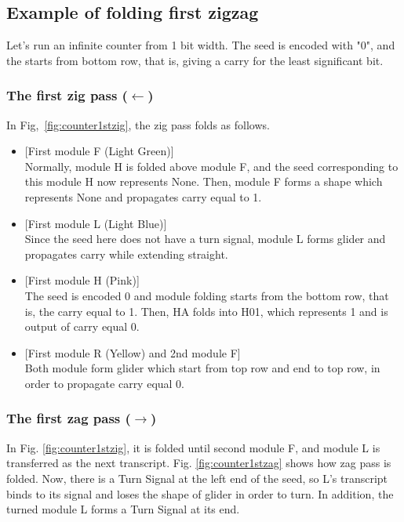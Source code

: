\documentclass[runningheads]{llncs}
\begin{document}
\subsection{Example of folding first zigzag}
Let's run an infinite counter from 1 bit width.
The seed is encoded with "0", and the starts from bottom row, that is, giving a carry for the least significant bit.

\subsubsection{The first zig pass ($\leftarrow$)}
In Fig,~\ref{fig:counter1stzig}, the zig pass folds as follows.
\begin{itemize}
\item{[First module F (Light Green)]} \\Normally, module H is folded above module F, and the seed corresponding to this module H now represents None.
Then, module F forms a shape which represents None and propagates carry equal to 1.
\item{[First module L (Light Blue)]} \\Since the seed here does not have a turn signal, module L forms glider and propagates carry while extending straight.

\item{[First module H (Pink)]} \\The seed is encoded 0 and module folding starts from the bottom row, that is, the carry equal to 1.
Then, HA folds into H01, which represents 1 and is output of carry equal 0.

\item{[First module R (Yellow) and 2nd module F]} \\Both module form glider which start from top row and end to top row, in order to propagate carry equal 0.

\end{itemize}

\subsubsection{The first zag pass ($\rightarrow$)}
In Fig. \ref{fig:counter1stzig}, it is folded until second module F, and module L is transferred as the next transcript.
Fig. \ref{fig:counter1stzag} shows how zag pass is folded.
Now, there is a Turn Signal at the left end of the seed, so L's transcript binds to its signal and loses the shape of glider in order to turn.
In addition, the turned module L forms a Turn Signal at its end.
\end{document}
